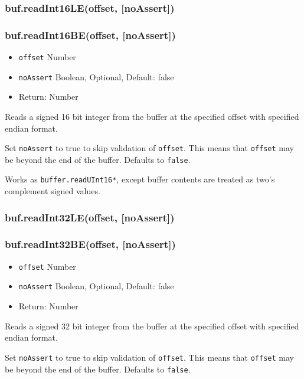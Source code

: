 \subsubsection{buf.readInt16LE(offset, {[}noAssert{]})}

\subsubsection{buf.readInt16BE(offset, {[}noAssert{]})}

\begin{itemize}
\item
  \texttt{offset} Number
\item
  \texttt{noAssert} Boolean, Optional, Default: false
\item
  Return: Number
\end{itemize}

Reads a signed 16 bit integer from the buffer at the specified offset
with specified endian format.

Set \texttt{noAssert} to true to skip validation of \texttt{offset}.
This means that \texttt{offset} may be beyond the end of the buffer.
Defaults to \texttt{false}.

Works as \texttt{buffer.readUInt16*}, except buffer contents are treated
as two's complement signed values.

\subsubsection{buf.readInt32LE(offset, {[}noAssert{]})}

\subsubsection{buf.readInt32BE(offset, {[}noAssert{]})}

\begin{itemize}
\item
  \texttt{offset} Number
\item
  \texttt{noAssert} Boolean, Optional, Default: false
\item
  Return: Number
\end{itemize}

Reads a signed 32 bit integer from the buffer at the specified offset
with specified endian format.

Set \texttt{noAssert} to true to skip validation of \texttt{offset}.
This means that \texttt{offset} may be beyond the end of the buffer.
Defaults to \texttt{false}.

